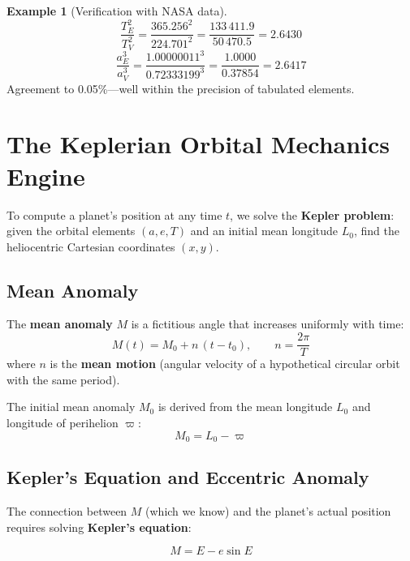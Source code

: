 \documentclass[11pt,letterpaper]{article}
\theoremstyle{definition}
\newtheorem{example}{Example}[section]
\theoremstyle{plain}
\theoremstyle{remark}
\begin{document}
\begin{example}[Verification with NASA data]
\[
  \frac{T_E^2}{T_V^2}
  = \frac{365.256^2}{224.701^2}
  = \frac{133\,411.9}{50\,470.5}
  = 2.6430
\]
\[
  \frac{a_E^3}{a_V^3}
  = \frac{1.00000011^3}{0.72333199^3}
  = \frac{1.0000}{0.37854}
  = 2.6417
\]
Agreement to 0.05\%—well within the precision of tabulated elements.
\end{example}


\section{The Keplerian Orbital Mechanics Engine}
\label{sec:keplerian}

To compute a planet's position at any time $t$, we solve the
\textbf{Kepler problem}: given the orbital elements $(a, e, T)$
and an initial mean longitude $L_0$, find the heliocentric
Cartesian coordinates $(x, y)$.

\subsection{Mean Anomaly}

The \textbf{mean anomaly} $M$ is a fictitious angle that increases
uniformly with time:
\begin{equation}
  M(t) = M_0 + n\,(t - t_0), \qquad
  n = \frac{2\pi}{T}
  \label{eq:mean_anomaly}
\end{equation}
where $n$ is the \textbf{mean motion} (angular velocity of a
hypothetical circular orbit with the same period).

The initial mean anomaly $M_0$ is derived from the mean longitude
$L_0$ and longitude of perihelion $\varpi$:
\begin{equation}
  M_0 = L_0 - \varpi
  \label{eq:M0}
\end{equation}

\subsection{Kepler's Equation and Eccentric Anomaly}

The connection between $M$ (which we know) and the planet's actual
position requires solving \textbf{Kepler's equation}:

\begin{equation}
  \boxed{M = E - e\sin E}
  \label{eq:kepler_eqn}
\end{equation}
\end{document}
